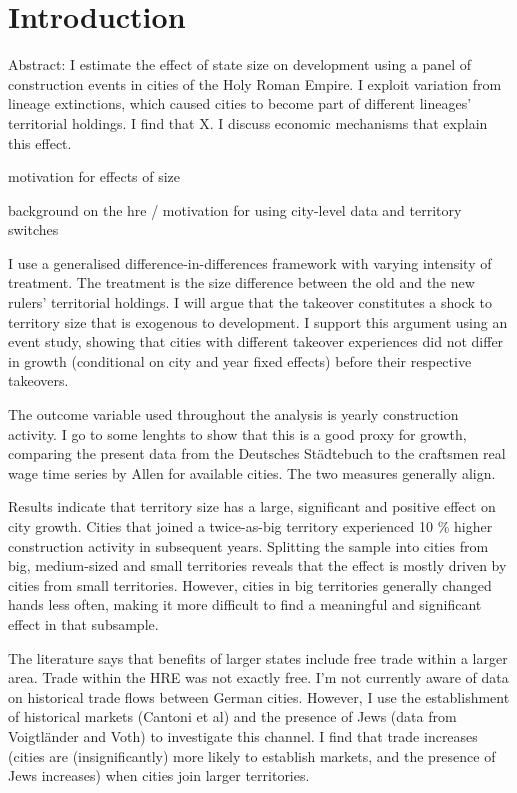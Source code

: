 \documentclass{article}
\begin{document}
\newpage

\setcounter{page}{1}
 
\section{Introduction}

Abstract: I estimate the effect of state size on development using a panel of construction events in cities of the Holy Roman Empire. I exploit variation from lineage extinctions, which caused cities to become part of different lineages' territorial holdings. I find that X. I discuss economic mechanisms that explain this effect.

motivation for effects of size 

background on the hre / motivation for using city-level data and territory switches

I use a generalised difference-in-differences framework with varying intensity of treatment. The treatment is the size difference between the old and the new rulers' territorial holdings. I will argue that the takeover constitutes a shock to territory size that is exogenous to development. I support this argument using an event study, showing that cities with different takeover experiences did not differ in growth (conditional on city and year fixed effects) before their respective takeovers. 

The outcome variable used throughout the analysis is yearly construction activity. I go to some lenghts to show that this is a good proxy for growth, comparing the present data from the Deutsches St\"adtebuch to the craftsmen real wage time series by Allen for available cities. The two measures generally align.

Results indicate that territory size has a large, significant and positive effect on city growth. Cities that joined a twice-as-big territory experienced 10 \% higher construction activity in subsequent years. Splitting the sample into cities from big, medium-sized and small territories reveals that the effect is mostly driven by cities from small territories. However, cities in big territories generally changed hands less often, making it more difficult to find a meaningful and significant effect in that subsample.

The literature says that benefits of larger states include free trade within a larger area. Trade within the HRE was not exactly free. I'm not currently aware of data on historical trade flows between German cities. However, I use the establishment of historical markets (Cantoni et al) and the presence of Jews (data from Voigtl\"ander and Voth) to investigate this channel. I find that trade increases (cities are (insignificantly) more likely to establish markets, and the presence of Jews increases) when cities join larger territories.

\newpage


\end{document}
